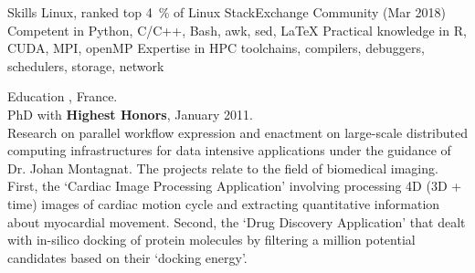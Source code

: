 \documentclass{resume}
\begin{document}
\begin{category}{Skills}
\citembullet Linux, ranked top 4~\% of Linux StackExchange Community (Mar 2018)
\citembullet Competent in Python, C/C++, Bash, awk, sed, \LaTeX
\citembullet Practical knowledge in R, CUDA, MPI, openMP
\citembullet Expertise in HPC toolchains, compilers, debuggers, schedulers, storage, network
\end{category}

\begin{category}{Education}
, France.\\
PhD with \textbf{Highest Honors}, January 2011.\\
Research on parallel workflow expression and enactment on large-scale
distributed computing infrastructures for data intensive applications under the
guidance of Dr.  Johan Montagnat. The projects relate to the field of
biomedical imaging. First, the `Cardiac Image Processing Application'
involving processing 4D (3D + time) images of cardiac motion cycle and
extracting quantitative information about myocardial movement. Second, the
`Drug Discovery Application' that dealt with in-silico docking of protein
molecules by filtering a million potential candidates based on their `docking
energy'.



\end{category}
\end{document}
